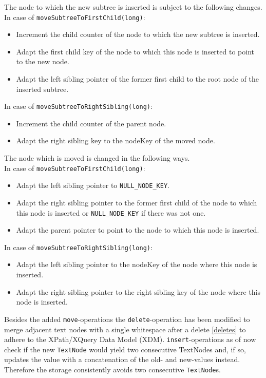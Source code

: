 The node to which the new subtree is inserted is subject to the following changes. \\
In case of \texttt{moveSubtreeToFirstChild(long)}:
\begin{itemize}
\item Increment the child counter of the node to which the new subtree is inserted.
\item Adapt the first child key of the node to which this node is inserted to point to the new node.
\item Adapt the left sibling pointer of the former first child to the root node of the inserted subtree.
\end{itemize}

In case of \texttt{moveSubtreeToRightSibling(long)}:
\begin{itemize}
\item Increment the child counter of the parent node.
\item Adapt the right sibling key to the nodeKey of the moved node.
\end{itemize}

The node which is moved is changed in the following ways. \\In case of \texttt{moveSubtreeToFirstChild(long)}:
\begin{itemize}
\item Adapt the left sibling pointer to \texttt{NULL\_NODE\_KEY}.
\item Adapt the right sibling pointer to the former first child of the node to which this node is inserted or \texttt{NULL\_NODE\_KEY} if there was not one.
\item Adapt the parent pointer to point to the node to which this node is inserted.
\end{itemize}

In case of \texttt{moveSubtreeToRightSibling(long)}:
\begin{itemize}
\item Adapt the left sibling pointer to the nodeKey of the node where this node is inserted.
\item Adapt the right sibling pointer to the right sibling key of the node where this node is inserted.
\end{itemize}

Besides the added \texttt{move}-operations the \texttt{delete}-operation has been modified to merge adjacent text nodes with a single whitespace after a delete \ref{deletes} to adhere to the XPath/XQuery Data Model (XDM). \texttt{insert}-operations as of now check if the new \texttt{TextNode} would yield two consecutive TextNodes and, if so, updates the value with a concatenation of the old- and new-values instead. Therefore the storage consistently avoids two consecutive \texttt{TextNode}s. 

